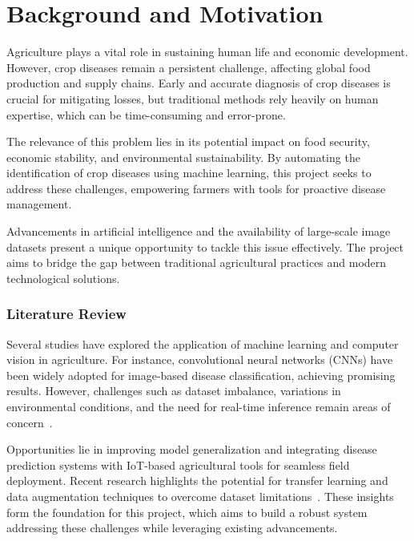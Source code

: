 \section{Background and Motivation}
Agriculture plays a vital role in sustaining human life and economic development. However, crop diseases remain a persistent challenge, affecting global food production and supply chains. Early and accurate diagnosis of crop diseases is crucial for mitigating losses, but traditional methods rely heavily on human expertise, which can be time-consuming and error-prone. 

The relevance of this problem lies in its potential impact on food security, economic stability, and environmental sustainability. By automating the identification of crop diseases using machine learning, this project seeks to address these challenges, empowering farmers with tools for proactive disease management.

Advancements in artificial intelligence and the availability of large-scale image datasets present a unique opportunity to tackle this issue effectively. The project aims to bridge the gap between traditional agricultural practices and modern technological solutions.

\subsubsection{Literature Review}
Several studies have explored the application of machine learning and computer vision in agriculture. For instance, convolutional neural networks (CNNs) have been widely adopted for image-based disease classification, achieving promising results. However, challenges such as dataset imbalance, variations in environmental conditions, and the need for real-time inference remain areas of concern~\cite{ref1, ref2}.

Opportunities lie in improving model generalization and integrating disease prediction systems with IoT-based agricultural tools for seamless field deployment. Recent research highlights the potential for transfer learning and data augmentation techniques to overcome dataset limitations~\cite{ref3}. These insights form the foundation for this project, which aims to build a robust system addressing these challenges while leveraging existing advancements.

